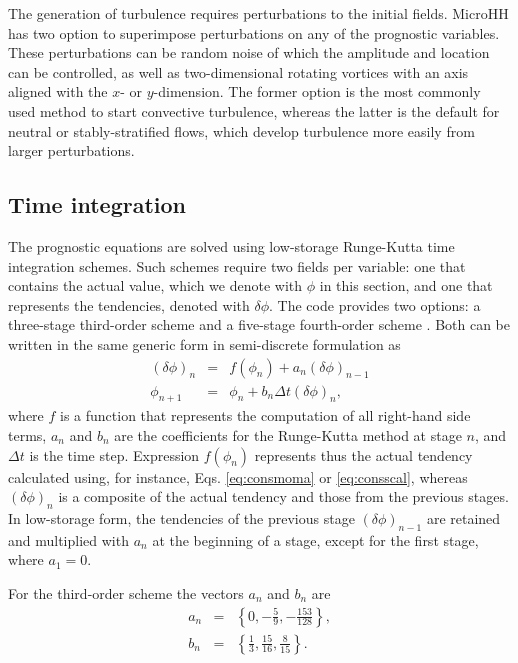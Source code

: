 \documentclass[gmd,manuscript]{copernicus}
\begin{document}
The generation of turbulence requires perturbations to the initial fields. MicroHH has two option to superimpose perturbations on any of the prognostic variables. These perturbations can be random noise of which the amplitude and location can be controlled, as well as two-dimensional rotating vortices with an axis aligned with the $x$- or $y$-dimension. The former option is the most commonly used method to start convective turbulence, whereas the latter is the default for neutral or stably-stratified flows, which develop turbulence more easily from larger perturbations.

\subsection{Time integration}\label{sec:time_integration}
The prognostic equations are solved using low-storage Runge-Kutta time integration schemes. Such schemes require two fields per variable: one that contains the actual value, which we denote with $\phi$ in this section, and one that represents the tendencies, denoted with $\delta \phi$. The code provides two options: a three-stage third-order scheme \citep{Williamson1980} and a five-stage fourth-order scheme \citep{Carpenter1994}. Both can be written in the same generic form in semi-discrete formulation as
\begin{eqnarray}
\left( \delta \phi \right)_n & = & f \left( \phi_n \right) + a_n \left( \delta \phi \right)_{n-1} \\
\phi_{n+1} & = & \phi_n + b_n \Delta t \left( \delta \phi \right)_{n},
\end{eqnarray}
where $f$ is a function that represents the computation of all right-hand side terms, $a_n$ and $b_n$ are the coefficients for the Runge-Kutta method at stage $n$, and $\Delta t$ is the time step. Expression $f \left( \phi_n \right)$ represents thus the actual tendency calculated using, for instance, Eqs. \ref{eq:consmoma} or \ref{eq:consscal}, whereas $(\delta \phi)_n$ is a composite of the actual tendency and those from the previous stages. In low-storage form, the tendencies of the previous stage $\left( \delta \phi \right)_{n-1}$ are retained and multiplied with $a_n$ at the beginning of a stage, except for the first stage, where $a_1 = 0$. 

For the third-order scheme the vectors $a_n$ and $b_n$ are
\begin{eqnarray}
a_n & = & \left\{0, -\frac{5}{9}, -\frac{153}{128} \right\},\\
b_n & = & \left\{\frac{1}{3}, \frac{15}{16}, \frac{8}{15} \right\}.
\end{eqnarray}
\end{document}
